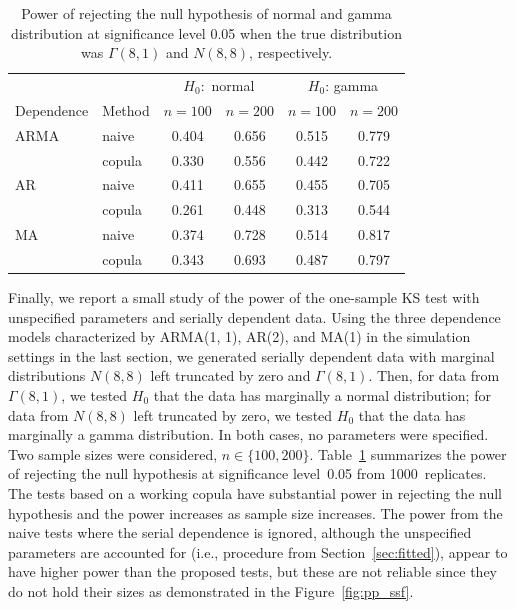 \documentclass[12pt, letterpaper, titlepage]{article}
\begin{document}
\begin{table}[tbp]
  \label{tab:power}
  \caption{Power of rejecting the null hypothesis of normal and gamma
    distribution at significance level 0.05 when the true distribution was
    $\Gamma(8, 1)$ and $N(8, 8)$, respectively. }
\centering
\begin{tabular}{ll cccc}
  \toprule
  &  & \multicolumn{2}{c}{$H_0:$ normal} &
  \multicolumn{2}{c}{$H_0$: gamma}\\
  \cmidrule(lr){3-4}\cmidrule(lr){5-6}
  Dependence & Method & $n = 100$ & $n = 200$ & $n = 100$ & $n = 200$\\
  \midrule
ARMA & naive & 0.404 & 0.656 & 0.515 & 0.779 \\ 
 & copula & 0.330 & 0.556 & 0.442 & 0.722 \\ 
AR & naive & 0.411 & 0.655 & 0.455 & 0.705 \\ 
& copula & 0.261 & 0.448 & 0.313 & 0.544 \\ 
MA & naive & 0.374 & 0.728 & 0.514 & 0.817 \\ 
& copula & 0.343 & 0.693 & 0.487 & 0.797 \\ 
   \bottomrule
\end{tabular}
\end{table}

Finally, we report a small study of the power of the one-sample KS test with
unspecified parameters and serially dependent data. Using the three dependence
models characterized by ARMA(1, 1), AR(2), and MA(1) in the simulation settings
in the last section, we generated serially
dependent data with marginal distributions $N(8, 8)$ left truncated by zero and
$\Gamma(8, 1)$. 
Then, for data from $\Gamma(8, 1)$, we tested $H_0$ that the
data has marginally a normal distribution; for data from $N(8, 8)$ left
truncated by zero, we tested $H_0$ that the data has marginally a gamma
distribution.  In both cases, no parameters were specified. Two sample sizes
were considered, $n \in \{100, 200\}$. Table~\ref{tab:power} summarizes the
power of rejecting the null hypothesis at significance level~0.05 from
1000~replicates. The tests
based on a working copula have substantial power in rejecting the null
hypothesis and the power increases as sample size increases. The power from the
naive tests where the serial dependence is ignored, although the unspecified
parameters are accounted for (i.e., procedure from 
Section~\ref{sec:fitted}), appear to 
have higher power than the proposed tests, but these are not reliable since they 
do not hold their sizes as demonstrated in the Figure~\ref{fig:pp_ssf}.
\end{document}
